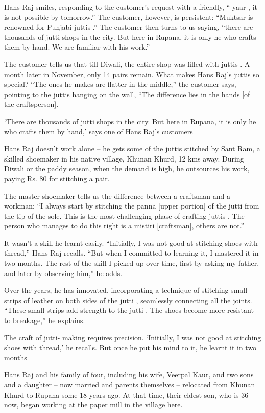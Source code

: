\documentclass[
]{interact}
\begin{document}
Hans Raj smiles, responding to the customer's request with a friendly,
`` yaar , it is not possible by tomorrow.'' The customer, however, is
persistent: ``Muktsar is renowned for Punjabi juttis .'' The customer
then turns to us saying, ``there are thousands of jutti shops in the
city. But here in Rupana, it is only he who crafts them by hand. We are
familiar with his work.''

The customer tells us that till Diwali, the entire shop was filled with
juttis . A month later in November, only 14 pairs remain. What makes
Hans Raj's juttis so special? ``The ones he makes are flatter in the
middle,'' the customer says, pointing to the juttis hanging on the wall,
``The difference lies in the hands {[}of the craftsperson{]}.

`There are thousands of jutti shops in the city. But here in Rupana, it
is only he who crafts them by hand,' says one of Hans Raj's customers

Hans Raj doesn't work alone -- he gets some of the juttis stitched by
Sant Ram, a skilled shoemaker in his native village, Khunan Khurd, 12
kms away. During Diwali or the paddy season, when the demand is high, he
outsources his work, paying Rs. 80 for stitching a pair.

The master shoemaker tells us the difference between a craftsman and a
workman: ``I always start by stitching the panna {[}upper portion{]} of
the jutti from the tip of the sole. This is the most challenging phase
of crafting juttis . The person who manages to do this right is a
mistiri {[}craftsman{]}, others are not.''

It wasn't a skill he learnt easily. ``Initially, I was not good at
stitching shoes with thread,'' Hans Raj recalls. ``But when I committed
to learning it, I mastered it in two months. The rest of the skill I
picked up over time, first by asking my father, and later by observing
him,'' he adds.

Over the years, he has innovated, incorporating a technique of stitching
small strips of leather on both sides of the jutti , seamlessly
connecting all the joints. ``These small strips add strength to the
jutti . The shoes become more resistant to breakage,'' he explains.

The craft of jutti- making requires precision. `Initially, I was not
good at stitching shoes with thread,' he recalls. But once he put his
mind to it, he learnt it in two months

Hans Raj and his family of four, including his wife, Veerpal Kaur, and
two sons and a daughter -- now married and parents themselves --
relocated from Khunan Khurd to Rupana some 18 years ago. At that time,
their eldest son, who is 36 now, began working at the paper mill in the
village here.
\end{document}

